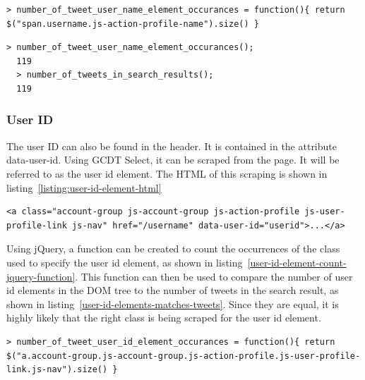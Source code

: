 \begin{lstlisting}[caption={Creating a function in GCDT JS Console for counting the occurance of user name elements on the Twitter search result page},label={user-name-element-count-jquery-function},captionpos=b]
  > number_of_tweet_user_name_element_occurances = function(){ return $("span.username.js-action-profile-name").size() }
\end{lstlisting}


\begin{lstlisting}[caption={Running functions in GCDT JS Console to show that the number of user name elements matches the number of tweets},label={user-elements-matches-tweets},captionpos=b]
  > number_of_tweet_user_name_element_occurances();
  119
  > number_of_tweets_in_search_results();
  119
\end{lstlisting}

\subsubsection{User ID}
The user ID can also be found in the header. It is contained in the attribute data-user-id. Using GCDT Select, it can be scraped from the page. It will be referred to as the user id element. The HTML of this scraping is shown in listing~\ref{listing:user-id-element-html}

\begin{lstlisting}[caption={HTML of the user id element in a tweet},label={listing:user-id-element-html},captionpos=b]
  <a class="account-group js-account-group js-action-profile js-user-profile-link js-nav" href="/username" data-user-id="userid">...</a>
\end{lstlisting}

\noindent
Using jQuery, a function can be created to count the occurrences of the class used to specify the user id element, as shown in listing~\ref{user-id-element-count-jquery-function}. This function can then be used to compare the number of user id elements in the DOM tree to the number of tweets in the search result, as shown in listing~\ref{user-id-elements-matches-tweets}. Since they are equal, it is highly likely that the right class is being scraped for the user id element.

\begin{lstlisting}[caption={Creating a function in GCDT JS Console for counting the occurance of user id elements on the Twitter search result page},label={user-id-element-count-jquery-function},captionpos=b]
  > number_of_tweet_user_id_element_occurances = function(){ return $("a.account-group.js-account-group.js-action-profile.js-user-profile-link.js-nav").size() }
\end{lstlisting}

